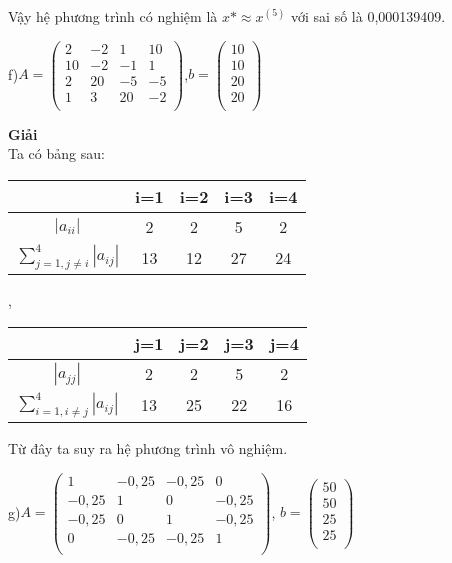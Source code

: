 Vậy hệ phương trình có nghiệm là $x*\approx x^{(5)} $ với sai số là 0,000139409.
\par
f)$A=\begin{pmatrix}	
2&-2&1&10\\	
10&-2&-1&1\\	
2&20&-5&-5\\	
1&3&20&-2\\	
\end{pmatrix}$,$b=\begin{pmatrix}
10\\
10\\
20\\
20\\
\end{pmatrix}$

\textbf{Giải}\\
Ta có bảng sau:
\begin{center}\begin{tabular}{|c|c|c|c|c|}\hline
&i=1&i=2&i=3&i=4\\\hline
$\left|a_{ii}\right|$&2&2&5&2\\\hline
$\sum\limits_{j=1,j\neq i}^{4} \left|a_{ij}\right|$&13&12&27&24\\\hline
\end{tabular}\end{center}
,
\begin{center}\begin{tabular}{|c|c|c|c|c|}\hline
&j=1&j=2&j=3&j=4\\\hline
$\left|a_{jj}\right|$&2&2&5&2\\\hline
$\sum\limits_{i=1,i\neq j}^{4} \left|a_{ij}\right|$&13&25&22&16\\\hline
\end{tabular}\end{center}
Từ đây ta suy ra hệ phương trình vô nghiệm.
\par
g)$A=\begin{pmatrix}
1&-0,25&-0,25&0\\
-0,25&1&0&-0,25\\
-0,25&0&1&-0,25\\
0&-0,25&-0,25&1\\
\end{pmatrix}$, $b=\begin{pmatrix}
50\\
50\\
25\\
25\\
\end{pmatrix}$

